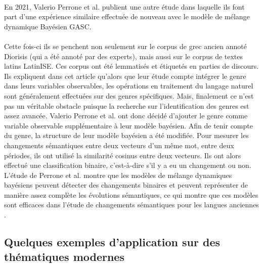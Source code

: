 \documentclass{article}
\begin{document}
\paragraph{}
En 2021, Valerio Perrone et al. publient une autre étude \cite{perrone2021lexical} dans laquelle ils font part d’une expérience similaire effectuée de nouveau avec le modèle de mélange dynamique Bayésien GASC. 
\paragraph{}
Cette fois-ci ils se penchent non seulement sur le corpus de grec ancien annoté Diorisis (qui a été annoté par des experts), mais aussi sur le corpus de textes latins LatinISE. Ces corpus ont été lemmatisés et étiquetés en parties de discours. Ils expliquent dans cet article qu’alors que leur étude compte intégrer le genre dans leurs variables observables, les opérations en traitement du langage naturel sont généralement effectuées sur des genres spécifiques. Mais, finalement ce n’est pas un véritable obstacle puisque la recherche sur l’identification des genres est assez avancée. Valerio Perrone et al. ont donc décidé d’ajouter le genre comme variable observable supplémentaire à leur modèle bayésien. Afin de tenir compte du genre, la structure de leur modèle bayésien a été modifiée. Pour mesurer les changements sémantiques entre deux vecteurs d’un même mot, entre deux périodes, ils ont utilisé la similarité cosinus entre deux vecteurs. Ils ont alors effectué une classification binaire, c’est-à-dire s’il y a eu un changement ou non. L’étude de Perrone et al. montre que les modèles de mélange dynamiques bayésiens peuvent détecter des changements binaires et peuvent représenter de manière assez complète les évolutions sémantiques, ce qui montre que ces modèles sont efficaces dans l’étude de changements sémantiques pour les langues anciennes \cite{perrone2021lexical}.

\subsection{Quelques exemples d'application sur des thématiques modernes}



\end{document}
